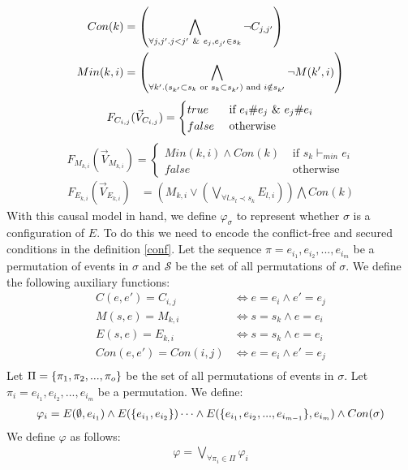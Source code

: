 \begin{align*}
    Con(k) & =   \left(
    \bigwedge_{\forall j,j'. j<j' \ \& \  e_j,e_{j'} \in s_k}
    \neg C_{j,j'}
    \right)             \\
    Min(k,i) & = \left(
        \bigwedge_{\forall k'. (s_{k'} \subset s_k \text{ or } s_k \subset s_{k'}) 
        \text{ and } i \notin s_{k'}}
        \neg M(k',i)
    \right)
\end{align*}
$$
    F_{C_{i,j}}(\vec V_{C_{i,j}}) = \begin{cases}
        true  & \text{ if } e_i \# e_j \ \& \  e_j \# e_i \\
        false & \text{ otherwise }
    \end{cases}
$$
$$
    F_{M_{k,i}}(\vec V_{M_{k,i}}) = \begin{cases}
        Min(k,i) \wedge Con(k) & \text{ if } s_k \vdash_{min} e_i \\
        false  & \text{ otherwise }
    \end{cases}
$$
\begin{align*}
    F_{E_{k,i}}(\vec V_{E_{k,i}}) & =
    \left(
    M_{k,i} \vee
    \left(
    \bigvee_{\forall l. s_l  \prec s_k}E_{l,i}
    \right)
    \right)
    \bigwedge
    Con(k)
\end{align*}
With this causal model in hand, we define $\varphi_{\sigma}$ to represent whether $\sigma$ is a configuration of $E$.
To do this we need to encode the conflict-free and secured conditions in the definition \ref{conf}.
Let the sequence $\pi = e_{i_1},e_{i_2},...,e_{i_m}$ be a
permutation of events in $\sigma$ and $\mathcal{S}$ be the set of
all permutations of $\sigma$.
We define the following auxiliary functions:
\begin{align*}
    C(e,e') = C_{i,j}    & \iff e = e_i \wedge e' = e_j \\
    M(s,e)  = M_{k,i}    & \iff s = s_k \wedge e = e_i  \\
    E(s,e)  = E_{k,i}    & \iff s = s_k \wedge e = e_i  \\
    Con(e,e') = Con(i,j) & \iff e = e_i \wedge e' = e_j \\
\end{align*}
Let $\Pi = \{\pi_1,\pi_2,...,\pi_o\}$ be the set of
all permutations of events in $\sigma$.
Let $\pi_i = e_{i_1},e_{i_2},...,e_{i_m}$ be a
permutation.
We define:
\begin{align*}
    \varphi_i = E(\emptyset,e_{i_1}) \wedge
    E(\{e_{i_1},e_{i_2}\}) \dots
    \wedge E(\{e_{i_1},e_{i_2},...,e_{i_{m-1}}\},e_{i_m}) \wedge Con(\sigma)
\end{align*}
We define $\varphi$ as follows:
\begin{align*}
    \varphi = \bigvee_{\forall \pi_i \in \Pi}\varphi_i
\end{align*}
\pagebreak
